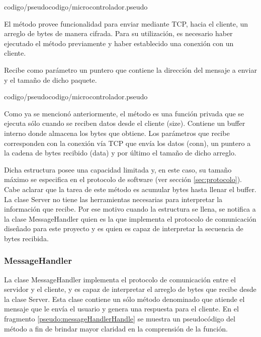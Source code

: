  {codigo/pseudocodigo/microcontrolador.pseudo}

El método  provee funcionalidad para enviar mediante TCP, hacia el cliente, un arreglo de bytes de manera cifrada.
Para su utilización, es necesario haber ejecutado el método  previamente y haber establecido una conexión con un cliente.

Recibe como parámetro un puntero que contiene la dirección del mensaje a enviar y el tamaño de dicho paquete.

 {codigo/pseudocodigo/microcontrolador.pseudo}

Como ya se mencionó anteriormente, el método  es una función privada que se ejecuta sólo cuando se reciben datos desde el cliente (size).
Contiene un buffer interno donde almacena los bytes que obtiene.
Los parámetros que recibe corresponden con la conexión vía TCP que envía los datos (conn), un puntero a la cadena de bytes recibido (data) y por último el tamaño de dicho arreglo.

Dicha estructura posee una capacidad limitada y, en este caso, su tamaño máximo se especifica en el protocolo de software (ver sección \ref{sec:protocolo}).
Cabe aclarar que la tarea de este método es acumular bytes hasta llenar el buffer. La clase Server no tiene las herramientas necesarias para interpretar la información que recibe.
Por ese motivo cuando la estructura se llena, se notifica a la clase MessageHandler quien es la que implementa el protocolo de comunicación diseñado para este proyecto y es quien es capaz de interpretar la secuencia de bytes recibida.



\subsubsection{MessageHandler}

La clase MessageHandler implementa el protocolo de comunicación entre el servidor y el cliente, y es capaz de interpretar el arreglo de bytes que recibe desde la clase Server.
Esta clase contiene un sólo método denominado  que atiende el mensaje que le envía el usuario y genera una respuesta para el cliente.
En el fragmento \ref{pseudo:messageHandlerHandle} se muestra un pseudocódigo del método a fin de brindar mayor claridad en la comprensión de la función.

